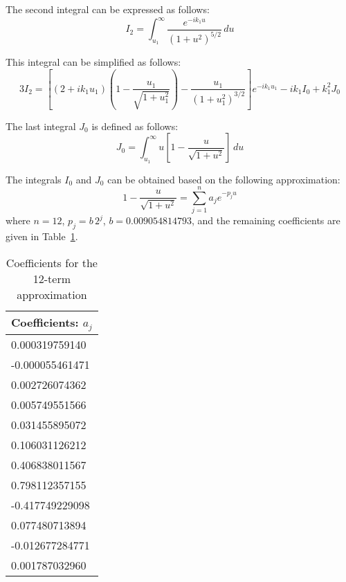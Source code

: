 \documentclass[12pt]{article}
\newcommand{\f}{\frac}
\begin{document}
The second integral can be expressed as follows:
\begin{equation*}
    I_{2} = \int_{u_{1}}^{\infty} \f{e^{-ik_1u}}{(1 + u^2)^{5/2}} \, du 
\end{equation*}

This integral can be simplified as follows:
%
\begin{equation*}
  3 I_{2} = \left[ (2 + ik_{1}u_{1}) \left( 1 - \f{u_{1}}{\sqrt{1 + u_{1}^2}}\right) 
    - \f{u_{1}}{(1 + u_{1}^2)^{3/2}}\right]e^{-ik_{1}u_{1}} - ik_{1} I_{0} + k_{1}^2J_{0}
\end{equation*}

The last integral $J_{0}$ is defined as follows:
%
\begin{equation*}
  J_{0} = \int_{u_{1}}^{\infty} u \left[ 1 - \f{u}{\sqrt{1 + u^2}} \right] \, du
\end{equation*}

The integrals $I_{0}$ and $J_{0}$ can be obtained based on the
following approximation:
%
\begin{equation*}
  1 - \f{u}{\sqrt{1 + u^{2}}} = \sum_{j=1}^{n} a_{j} e^{-p_{j}u}
\end{equation*}
%
where $n = 12$, $p_{j} = b\,2^{j}$, $b = 0.009054814793$, and the
remaining coefficients are given in Table~\ref{table:a-coef}.
%
\begin{table}[h]
  \begin{center}
    \begin{tabular}{l}
      \toprule
      Coefficients: $a_{j}$ \\
      \midrule
      0.000319759140 \\
      -0.000055461471 \\
      0.002726074362 \\
      0.005749551566 \\
      0.031455895072 \\
      0.106031126212 \\
      0.406838011567 \\
      0.798112357155 \\
      -0.417749229098 \\
      0.077480713894 \\
      -0.012677284771 \\
      0.001787032960 \\
      \bottomrule
    \end{tabular}
  \end{center}
  \caption{Coefficients for the 12-term approximation}
  \label{table:a-coef}
\end{table}
\end{document}
